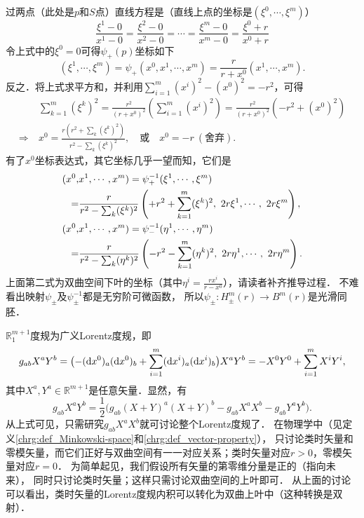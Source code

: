 过两点（此处是$p$和$S$点）直线方程是（直线上点的坐标是$(\xi^0,\cdots,\xi^m)$）
\begin{equation}
    \frac{\xi^1-0}{x^1 -0} =\frac{\xi^2-0}{x^2 -0}=\cdots=
    \frac{\xi^m-0}{x^m -0} = \frac{\xi^{0}+r}{x^{0} +r}
\end{equation}
令上式中的$\xi^{0}=0$可得$\psi_{+}(p)$坐标如下
\begin{equation}
    (\xi^1,\cdots,\xi^m)=\psi_{+}(x^0,x^1 ,\cdots,x^{m})=
    \frac{r}{r+x^{0}}(x^1,\cdots,x^m).
\end{equation}
反之．将上式求平方和，并利用$\sum_{i=1}^{m}(x^i)^2 -(x^{0})^2=-r^2$，可得
\begin{align*}
    & \sum_{k=1}^{m}(\xi^k)^2=\frac{r^2 }{(r+x^{0})^2}\left(\sum_{i=1}^{m}(x^i)^2\right)
    =\frac{r^2 }{(r+x^{0})^2}\left(-r^2+(x^{0})^2\right) \\
    \Rightarrow \ 
    & x^{0} = \frac{r\left(r^2+\sum\nolimits_k(\xi^k)^2\right)}{r^2-\sum\nolimits_k(\xi^k)^2},
    {\quad \text{或} \quad } x^{0}= -r \ (\text{舍弃}) .
\end{align*}
有了$x^0$坐标表达式，其它坐标几乎一望而知，它们是
\begin{align}
    (x^{0},& x^1,\cdots,x^m) = \psi_{+}^{-1}(\xi^1,\cdots,\xi^m) \notag \\
    =&\frac{r}{r^2-\sum\nolimits_k(\xi^k)^2}
    \left(+r^2+\sum_{k=1}^m(\xi^k)^2, \ 2 r \xi^1, \cdots, \ 2 r \xi^m \right),
    \label{chdm:eqn_hybxi2x} \\
    (x^{0},& x^1,\cdots,x^m) = \psi_{-}^{-1}(\eta^1,\cdots,\eta^m) \notag \\
    =&\frac{r}{r^2-\sum\nolimits_k(\eta^k)^2}
    \left(- r^2-\sum_{k=1}^m (\eta^k)^2 , \ 2 r \eta^1, \cdots, \ 2 r \eta^m \right).
    \label{chdm:eqn_mybeta2x}
\end{align}
上面第二式为双曲空间下叶的坐标（其中$\eta^i=\frac{r x^i}{r-x^{0}}$），请读者补齐推导过程．
不难看出映射$\psi_{\pm}$及$\psi_{\pm}^{-1}$都是无穷阶可微函数，
所以$\psi_{\pm}:H^m_{\pm}(r)\to B^m(r)$是光滑同胚．

$\mathbb{R}^{m+1}_1$度规为广义Lorentz度规，即
\begin{equation*}
    g_{ab}X^a Y^b = \bigl(-({\rm d}x^0)_a({\rm d}x^0)_b+ \sum_{i=1}^{m}({\rm d}x^i)_a({\rm d}x^i)_b\bigr)
    X^a Y^b=-X^0 Y^0 + \sum_{i=1}^{m} X^i Y^i,
\end{equation*}
其中$X^a, Y^a\in \mathbb{R}^{m+1}$是任意矢量．显然，有
\begin{equation}
    g_{ab}X^a Y^b = \frac{1}{2}\bigl(g_{ab}(X+Y)^a(X+Y)^b -g_{ab}X^a X^b -g_{ab}Y^a Y^b\bigr).
\end{equation}
从上式可见，只需研究$g_{ab}X^a X^b$就可讨论整个Lorentz度规了．
在物理学中（见定义\ref{chrg:def_Minkowski-space}和\ref{chrg:def_vector-property}），
只讨论类时矢量和零模矢量，而它们正好与双曲空间有一一对应关系；类时矢量对应$r>0$，零模矢量对应$r=0$．
为简单起见，我们假设所有矢量的第零维分量是正的（指向未来），
同时只讨论类时矢量；这样只需讨论双曲空间的上叶即可．
从上面的讨论可以看出，类时矢量的Lorentz度规内积可以转化为双曲上叶中（这种转换是双射）．

